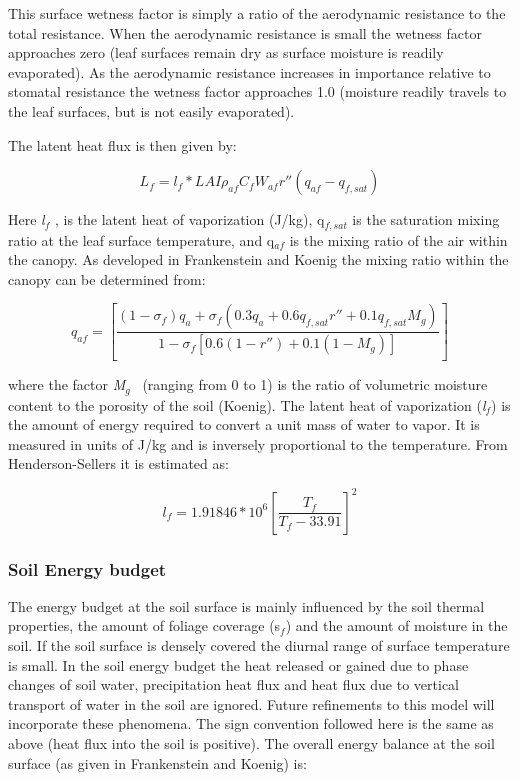 This surface wetness factor is simply a ratio of the aerodynamic resistance to the total resistance. When the aerodynamic resistance is small the wetness factor approaches zero (leaf surfaces remain dry as surface moisture is readily evaporated). As the aerodynamic resistance increases in importance relative to stomatal resistance the wetness factor approaches 1.0 (moisture readily travels to the leaf surfaces, but is not easily evaporated).

The latent heat flux is then given by:

\begin{equation}
{L_f} = {l_f} * LAI{\rho_{af}}{C_f}{W_{af}}{r''}\left( {{q_{af}} - {q_{f,sat}}} \right)
\end{equation}

Here \emph{l\(_{f}\)} , is the latent heat of vaporization (J/kg), q\(_{f,sat}\) is the saturation mixing ratio at the leaf surface temperature, and q\(_{af}\) is the mixing ratio of the air within the canopy. As developed in Frankenstein and Koenig the mixing ratio within the canopy can be determined from:

\begin{equation}
{q_{af}} = \left[ {\frac{{\left( {1 - {\sigma_f}} \right){q_a} + {\sigma_f}\left( {0.3{q_a} + 0.6{q_{f,sat}}{r''} + 0.1{q_{f,sat}}{M_g}} \right)}}{{1 - {\sigma_f}\left[ {0.6\left( {1 - {r''}} \right) + 0.1\left( {1 - {M_g}} \right)} \right]}}} \right]
\end{equation}

where the factor \emph{M\(_{g}\)} ~(ranging from 0 to 1) is the ratio of volumetric moisture content to the porosity of the soil (Koenig). The latent heat of vaporization (\emph{l\(_{f}\)}) is the amount of energy required to convert a unit mass of water to vapor. It is measured in units of J/kg and is inversely proportional to the temperature. From Henderson-Sellers it is estimated as:

\begin{equation}
{l_f} = 1.91846*{10^6}{\left[ {\frac{{{T_f}}}{{{T_f} - 33.91}}} \right]^2}
\end{equation}

\subsubsection{Soil Energy budget}\label{soil-energy-budget}

The energy budget at the soil surface is mainly influenced by the soil thermal properties, the amount of foliage coverage (s\(_{f}\)) and the amount of moisture in the soil. If the soil surface is densely covered the diurnal range of surface temperature is small. In the soil energy budget the heat released or gained due to phase changes of soil water, precipitation heat flux and heat flux due to vertical transport of water in the soil are ignored. Future refinements to this model will incorporate these phenomena. The sign convention followed here is the same as above (heat flux into the soil is positive). The overall energy balance at the soil surface (as given in Frankenstein and Koenig) is:

